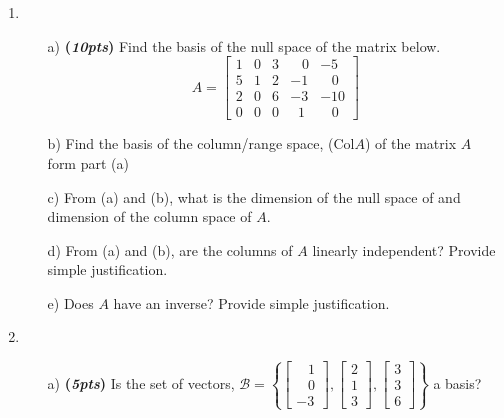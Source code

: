 \documentclass[12pt]{article}%
\begin{document}
\begin{enumerate}     
    \item 
    \begin{itemize}
        \item[a)] \textbf{(\emph{10pts})} Find the basis of the null space of the matrix below. 
        \[
        A = \begin{bmatrix}
        1 & 0 & 3 & \;\;\;0 & -5 \\
        5 & 1 & 2 & -1  & \;\;\;0 \\
        2 & 0 & 6 & -3 & -10 \\
        0 & 0 & 0 & \;\;1 & \;\;\;0
        \end{bmatrix}
        \]
        

         \item[b)] Find the basis of the column/range space, (Col\(A\)) of the matrix \(A\) form part (a)
        
        \item[c)] From (a) and (b), what is the dimension of the  null space of  and dimension of the column space of \(A\).
        
        \item[d)] From (a) and (b), are the columns of \(A\) linearly independent?  Provide simple justification.
        
        \item[e)] Does \(A\) have an inverse? Provide simple justification.
    \end{itemize}
    


    \item 
    \begin{itemize}
        \item[a)]\textbf{(\emph{5pts})} 
            Is the set of vectors, 
            \(
            \mathcal{B} = \left\{
            \begin{bmatrix} \;\;\;1\\\;\;\;0\\-3 \end{bmatrix},
            \begin{bmatrix} 2\\1\\3 \end{bmatrix},
            \begin{bmatrix} 3\\3\\6 \end{bmatrix}
            \right\}
            \)
            a basis?


\end{itemize}
\end{enumerate}
\end{document}
